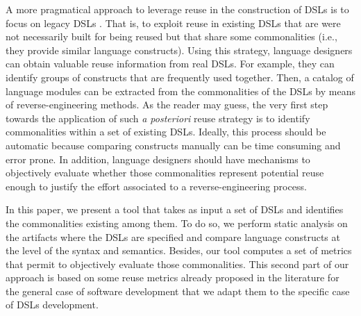A more pragmatical approach to leverage reuse in the construction of DSLs is to focus on legacy DSLs \cite{degueule:2015}. That is, to exploit reuse in existing DSLs that are were not necessarily built for being reused but that share some commonalities (i.e., they provide similar language constructs). Using this strategy, language designers can obtain valuable reuse information from real DSLs. For example, they can identify groups of constructs that are frequently used together. Then, a catalog of language modules can be extracted from the commonalities of the DSLs by means of reverse-engineering methods. As the reader may guess, the very first step towards the application of such \textit{a posteriori} reuse strategy is to identify commonalities within a set of existing DSLs. Ideally, this process should be automatic because comparing constructs manually can be time consuming and error prone. In addition, language designers should have mechanisms to objectively evaluate whether those commonalities represent potential reuse enough to justify the effort associated to a reverse-engineering process. 

In this paper, we present a tool that takes as input a set of DSLs and identifies the commonalities existing among them. To do so, we perform static analysis on the artifacts where the DSLs are specified and compare language constructs at the level of the syntax and semantics. Besides, our tool computes a set of metrics that permit to objectively evaluate those commonalities. This second part of our approach is based on some reuse metrics already proposed in the literature for the general case of software development \cite{Berger:2014,Berger:126283} that we adapt them to the specific case of DSLs development.


